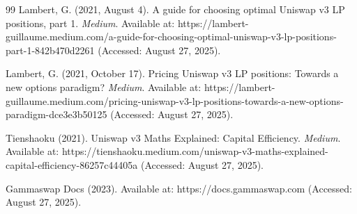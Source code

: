\documentclass{article}
\begin{document}
\begin{thebibliography}{99}
Lambert, G. (2021, August 4). A guide for choosing optimal Uniswap v3 LP positions, part 1. \textit{Medium}. Available at: https://lambert-guillaume.medium.com/a-guide-for-choosing-optimal-uniswap-v3-lp-positions-part-1-842b470d2261 (Accessed: August 27, 2025).

Lambert, G. (2021, October 17). Pricing Uniswap v3 LP positions: Towards a new options paradigm? \textit{Medium}. Available at: https://lambert-guillaume.medium.com/pricing-uniswap-v3-lp-positions-towards-a-new-options-paradigm-dce3e3b50125 (Accessed: August 27, 2025).

Tienshaoku (2021). Uniswap v3 Maths Explained: Capital Efficiency. \textit{Medium}. Available at: https://tienshaoku.medium.com/uniswap-v3-maths-explained-capital-efficiency-86257c44405a (Accessed: August 27, 2025).

Gammaswap Docs (2023). Available at:  https://docs.gammaswap.com (Accessed: August 27, 2025).

\end{thebibliography}
\end{document}
